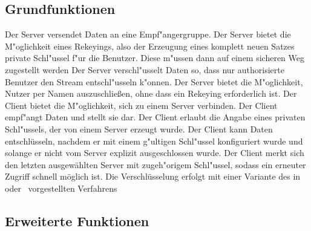 \documentclass[a4paper,10pt]{scrartcl}
\begin{document}
\subsection{Grundfunktionen}

\begin{usecase}
 {Der Server versendet Daten an eine Empf"angergruppe.}
 {Der Server bietet die M"oglichkeit eines Rekeyings, also
                 der Erzeugung eines komplett neuen Satzes private Schl"ussel
                 f"ur die Benutzer. Diese m"ussen dann auf einem sicheren
                 Weg zugestellt werden}
 {Der Server verschl"usselt Daten so, dass nur authorisierte
                 Benutzer den Stream entschl"usseln k"onnen.}
 {Der Server bietet die M"oglichkeit, Nutzer per Namen auszuschließen,
                 ohne dass ein Rekeying erforderlich ist.}
 {Der Client bietet die M"oglichkeit, sich zu einem Server verbinden.}
 {Der Client empf"angt Daten und stellt sie dar.}
 {Der Client erlaubt die Angabe eines privaten Schl"ussels, der von
                 einem Server erzeugt wurde.}
 {Der Client kann Daten entschlüsseln, nachdem er mit einem
                 g"ultigen Schl"ussel konfiguriert wurde und solange er nicht
                 vom Server explizit ausgeschlossen wurde.}
 {Der Client merkt sich den letzten ausgewählten Server mit
                 zugeh"origem Schl"ussel, sodass ein erneuter Zugriff schnell möglich
                 ist.}
 {Die Verschlüsselung erfolgt mit einer Variante des in~\cite[Section 2.2]{Naor00}
                  oder~\cite{Garg10} vorgestellten Verfahrens}
\end{usecase}

\subsection{Erweiterte Funktionen}
\end{document}
